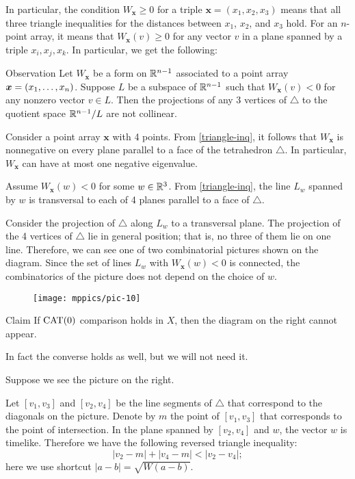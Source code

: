 \documentclass{article}
\begin{document}
In particular, the condition $W_{\bm{x}}\ge 0$ for a triple $\bm{x}=(x_1,x_2,x_3)$ means that 
all three triangle inequalities for the distances between $x_1$, $x_2$, and $x_3$ hold.
For an $n$-point array, it means that $W_{\bm{x}}(v)\ge 0$ for any vector $v$ in a plane spanned by a triple $x_i,x_j,x_k$.
In particular, we get the following:

\begin{thm}{Observation}\label{triangle-inq}
Let $W_{\bm{x}}$ be a form on $\mathbb{R}^{n-1}$ associated to a point array $\bm{x}\z=(x_1,\dots,x_n)$.
Suppose $L$ be a subspace of $\mathbb{R}^{n-1}$ such that
$W_{\bm{x}}(v)< 0$ for any nonzero vector $v\in L$.
Then the projections of any 3 vertices of $\triangle$ to the quotient space $\mathbb{R}^{n-1}/L$ are not collinear.
\end{thm}

Consider a point array $\bm{x}$ with 4 points.
From \ref{triangle-inq}, 
it follows that $W_{\bm{x}}$ 
is nonnegative on every plane parallel to a face of the tetrahedron $\triangle$.
In particular, $W_{\bm{x}}$ can have at most one negative eigenvalue.

Assume $W_{\bm{x}}(w)<0$ for some $w\in\mathbb{R}^3$.
From \ref{triangle-inq}, the line $L_w$ spanned by
$w$ is transversal to each of 4 planes parallel to a face of $\triangle$.

Consider the projection of $\triangle$ along $L_w$ to a transversal plane. 
The projection of the 4 vertices of $\triangle$ lie in general position; 
that is, no three of them lie on one line.
Therefore, we can see one of two combinatorial pictures shown on the diagram.
Since the set of lines $L_w$ with $W_{\bm{x}}(w)<0$ is connected,
the combinatorics of the picture does not depend on the choice of $w$.

{

\begin{wrapfigure}{r}{33mm}
\vskip-0mm
\centering
\texttt{[image: mppics/pic-10]}
\end{wrapfigure}

\begin{thm}{Claim}
If $\mathrm{CAT}(0)$ comparison holds in $X$, then the diagram on the right cannot appear. 
\end{thm}

In fact the converse holds as well, but we will not need it.

}

Suppose we see the picture on the right.

Let $[v_1,v_3]$ and $[v_2,v_4]$ be the line segments of $\triangle$ that correspond to the diagonals on the picture.
Denote by $m$ the point of $[v_1,v_3]$ that corresponds to the point of intersection.
In the plane spanned by $[v_2,v_4]$ and $w$, the vector $w$ is timelike.
Therefore we have the following reversed triangle inequality:
\[|v_2-m|+|v_4-m|<|v_2-v_4|;\]
here we use shortcut $|a-b|=\sqrt{W(a-b)}$.
\end{document}
